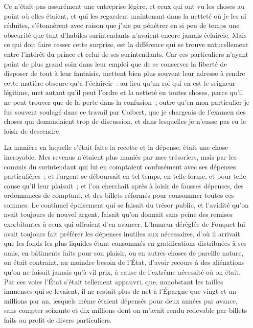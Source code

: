 \documentclass[french,twoside]{book} %
\begin{document}
Ce n’était pas assurément une entreprise légère, et ceux qui ont vu les choses au point où elles étaient, et qui les regardent maintenant dans la netteté où je les ai réduites, s’étonnèrent avec raison que j’aie pu pénétrer en si peu de temps une obscurité que tant d’habiles surintendants n’avaient encore jamais éclaircie. Mais ce qui doit faire cesser cette surprise, est la différence qui se trouve naturellement entre l’intérêt du prince et celui de ses surintendants. Car ces particuliers n’ayant point de plus grand soin dans leur emploi que de se conserver la liberté de disposer de tout à leur fantaisie, mettent bien plus souvent leur adresse à rendre cette matière obscure qu’à l’éclaircir : au lieu qu’un roi qui en est le seigneur légitime, met autant qu’il peut l’ordre et la netteté en toutes choses, parce qu’il ne peut trouver que de la perte dans la confusion ; outre qu’en mon particulier je fus souvent soulagé dans ce travail par Colbert, que je chargeais de l’examen des choses qui demandaient trop de discussion, et dans lesquelles je n’eusse pas eu le loisir de descendre.\par
La manière en laquelle s’était faite la recette et la dépense, était une chose incroyable. Mes revenus n’étaient plus maniés par mes trésoriers, mais par les commis du surintendant qui lui en comptaient confusément avec ses dépenses particulières ; et l’argent se déboursait en tel temps, en telle forme, et pour telle cause qu’il leur plaisait ; et l’on cherchait après à loisir de fausses dépenses, des ordonnances de comptant, et des billets réformés pour consommer toutes ces sommes. Le continuel épuisement qui se faisait du trésor public, et l’avidité qu’on avait toujours de nouvel argent, faisait qu’on donnait sans peine des remises exorbitantes à ceux qui offraient d’en avancer. L’humeur déréglée de Fouquet lui avait toujours fait préférer les dépenses inutiles aux nécessaires, d’où il arrivait que les fonds les plus liquides étant consommés en gratifications distribuées à ses amis, en bâtiments faits pour son plaisir, ou en autres choses de pareille nature, on était contraint, au moindre besoin de l’État, d’avoir recours à des aliénations qu’on ne faisait jamais qu’à vil prix, à cause de l’extrême nécessité où on était. Par ces voies l’État s’était tellement appauvri, que, nonobstant les tailles immenses qui se levaient, il ne restait plus de net à l’Épargne que vingt et un millions par an, lesquels même étaient dépensés pour deux années par avance, sans compter soixante et dix millions dont on m’avait rendu redevable par billets faits au profit de divers particuliers.\par
\end{document}
